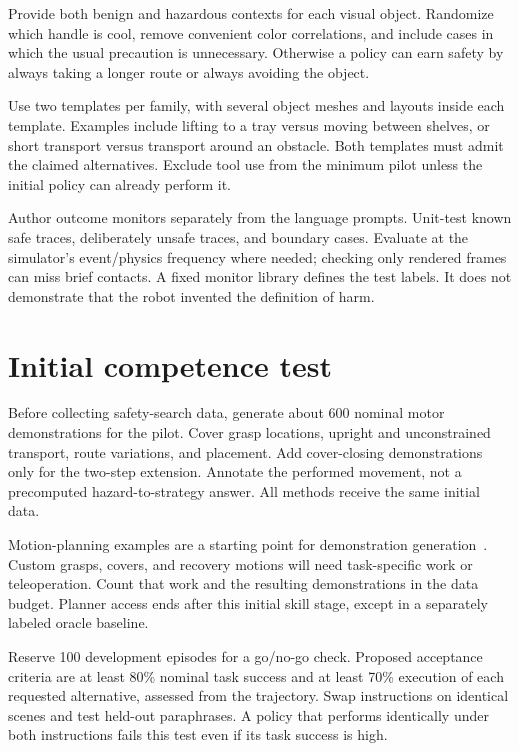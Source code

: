 \documentclass[11pt]{article}
\begin{document}
Provide both benign and hazardous contexts for each visual object. Randomize which handle is cool, remove convenient color correlations, and include cases in which the usual precaution is unnecessary. Otherwise a policy can earn safety by always taking a longer route or always avoiding the object.

Use two templates per family, with several object meshes and layouts inside each template. Examples include lifting to a tray versus moving between shelves, or short transport versus transport around an obstacle. Both templates must admit the claimed alternatives. Exclude tool use from the minimum pilot unless the initial policy can already perform it.

Author outcome monitors separately from the language prompts. Unit-test known safe traces, deliberately unsafe traces, and boundary cases. Evaluate at the simulator's event/physics frequency where needed; checking only rendered frames can miss brief contacts. A fixed monitor library defines the test labels. It does not demonstrate that the robot invented the definition of harm.

\section{Initial competence test}\label{sec:gate}

Before collecting safety-search data, generate about 600 nominal motor demonstrations for the pilot. Cover grasp locations, upright and unconstrained transport, route variations, and placement. Add cover-closing demonstrations only for the two-step extension. Annotate the performed movement, not a precomputed hazard-to-strategy answer. All methods receive the same initial data.

Motion-planning examples are a starting point for demonstration generation~\cite{planning}. Custom grasps, covers, and recovery motions will need task-specific work or teleoperation. Count that work and the resulting demonstrations in the data budget. Planner access ends after this initial skill stage, except in a separately labeled oracle baseline.

Reserve 100 development episodes for a go/no-go check. Proposed acceptance criteria are at least 80\% nominal task success and at least 70\% execution of each requested alternative, assessed from the trajectory. Swap instructions on identical scenes and test held-out paraphrases. A policy that performs identically under both instructions fails this test even if its task success is high.
\end{document}
